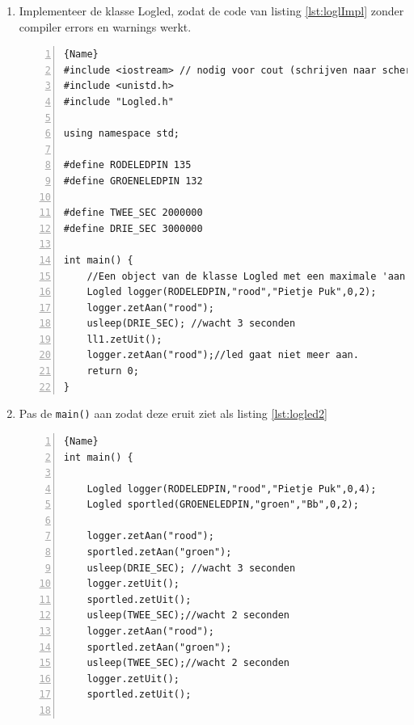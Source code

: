 \begin{enumerate}[label=\alph*]
	\item Implementeer de klasse Logled, zodat de code van listing \ref{lst:loglImpl} zonder compiler errors en warnings werkt.
	\begin{lstlisting}[caption=Een test van de klasse \texttt{LogLed}. ,frame=trbl,firstnumber=1,numbers=left,label={lst:loglImpl}]{Name}
#include <iostream> // nodig voor cout (schrijven naar scherm)
#include <unistd.h>
#include "Logled.h"

using namespace std;

#define RODELEDPIN 135
#define GROENELEDPIN 132

#define TWEE_SEC 2000000
#define DRIE_SEC 3000000

int main() {
	//Een object van de klasse Logled met een maximale 'aan' tijd van 2 seconde 
	Logled logger(RODELEDPIN,"rood","Pietje Puk",0,2);
	logger.zetAan("rood");
	usleep(DRIE_SEC); //wacht 3 seconden
	ll1.zetUit();
	logger.zetAan("rood");//led gaat niet meer aan.
	return 0;
}	
\end{lstlisting}
\item  Pas de \texttt{main()} aan zodat deze eruit ziet als listing \ref{lst:logled2}
\begin{lstlisting}[caption=Twee objecten van de klasse \texttt{LogLed}. ,frame=trbl,firstnumber=1,numbers=left,label={lst:logled2}]{Name}
int main() {
	
	Logled logger(RODELEDPIN,"rood","Pietje Puk",0,4);
	Logled sportled(GROENELEDPIN,"groen","Bb",0,2);
	
	logger.zetAan("rood");
	sportled.zetAan("groen");
	usleep(DRIE_SEC); //wacht 3 seconden
	logger.zetUit();
	sportled.zetUit();
	usleep(TWEE_SEC);//wacht 2 seconden
	logger.zetAan("rood");
	sportled.zetAan("groen");
	usleep(TWEE_SEC);//wacht 2 seconden
	logger.zetUit();
	sportled.zetUit();
	

\end{lstlisting}
\end{enumerate}
